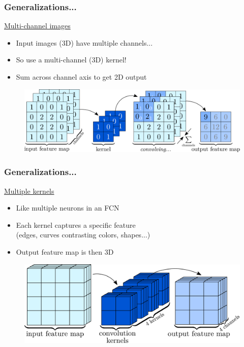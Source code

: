 \documentclass[14pt, t]{beamer}
\begin{document}
\begin{frame}
    \frametitle{Generalizations...}

    \underline{Multi-channel images}
    \begin{itemize}
    
        \item Input images (3D) have multiple channels...

        \item So use a multi-channel (3D) kernel!

        \item Sum across channel axis to get 2D output
    
    \end{itemize}

    \begin{figure}[htb!]
    \centering
    \includegraphics[width=\linewidth]{vector/conv-multi-channel.pdf}
    \end{figure}

\end{frame}

\begin{frame}
    \frametitle{Generalizations...}

    \underline{Multiple kernels}
    \begin{itemize}
    
        \item Like multiple neurons in an FCN

        \item Each kernel captures a specific feature\\
        {\small (edges, curves contrasting colors, shapes...)}

        \item Output feature map is then 3D
    
    \end{itemize}

    \begin{figure}[htb!]
    \centering
    \includegraphics[width=\linewidth]{vector/figures-presentation/cnn-multi-kernel.pdf}
    \end{figure}   

\end{frame}
\end{document}
